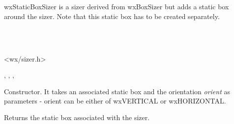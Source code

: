 \section{}\label{wxstaticboxsizer}

wxStaticBoxSizer is a sizer derived from wxBoxSizer but adds a static
box around the sizer. Note that this static box has to be created 
separately.


\\
\\


<wx/sizer.h>


, , , 


\label{wxstaticboxsizerwxstaticboxsizer}


Constructor. It takes an associated static box and the orientation {\it orient} 
as parameters - orient can be either of wxVERTICAL or wxHORIZONTAL.

\label{wxstaticboxsizergetstaticbox}


Returns the static box associated with the sizer.

